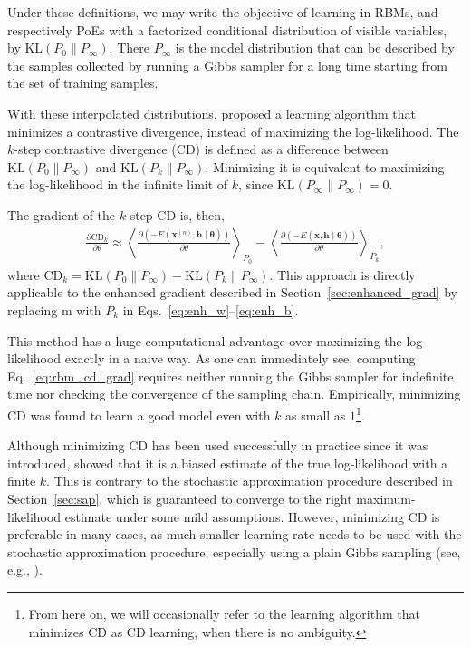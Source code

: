 \documentclass[dissertation,nocontribution,draft*]{aaltoseries}
\newcommand{\vect}[1]{\mathbf{#1}}
\newcommand{\vects}[1]{\boldsymbol{#1}}
\newcommand{\vh}[0]{\vect{h}}
\newcommand{\vx}[0]{\vect{x}}
\newcommand{\tf}[0]{\text{m}}
\newcommand{\TT}[0]{{\vects{\theta}}}
\newcommand{\KL}[0]{\text{KL}}
\newcommand{\CD}[0]{\text{CD}}
\begin{document}
Under these definitions, we may write the objective of
learning in RBMs, and respectively PoEs with a factorized
conditional distribution of visible variables, by $\KL(P_0
\| P_\infty)$. There $P_\infty$ is the model distribution
that can be described by the samples collected by running a
Gibbs sampler for a long time starting from the set of training
samples.

With these interpolated distributions, \citet{Hinton2002}
proposed a learning algorithm that minimizes a contrastive
divergence, instead of maximizing the log-likelihood. The
$k$-step contrastive divergence
(CD) is defined as a
difference between $\KL(P_0 \| P_{\infty})$ and $\KL(P_k \|
P_\infty)$. Minimizing it is equivalent to maximizing
the log-likelihood in the infinite limit of $k$, since
$\KL(P_\infty \| P_\infty) = 0$.

The gradient of the $k$-step CD is, then,
\begin{align}
    \label{eq:rbm_cd_grad}
    \frac{\partial \CD_k}{\partial \theta} \approx
    \left< \frac{\partial
    \left(-E(\vx^{(n)}, \vh\mid\TT)\right)}{\partial \theta}
    \right>_{P_0} 
    -
    \left< \frac{\partial
    \left(-E(\vx, \vh\mid\TT)\right)}{\partial \theta}
    \right>_{P_k},
\end{align}
where $\CD_k = \KL(P_0 \| P_{\infty}) - \KL(P_k
\| P_\infty)$. This approach is directly applicable to the
enhanced gradient described in
Section~\ref{sec:enhanced_grad} by replacing $\tf$ with
$P_k$ in Eqs.~\eqref{eq:enh_w}--\eqref{eq:enh_b}.

This method has a huge computational advantage over
maximizing the log-likelihood exactly in a naive way. As one
can immediately see, computing Eq.~\eqref{eq:rbm_cd_grad}
requires neither running the Gibbs sampler for indefinite
time nor checking the convergence of the sampling chain.
Empirically, minimizing CD was found to learn a good model
even with $k$ as small as $1$\footnote{ From here on, we
will occasionally refer to the learning algorithm that
minimizes CD as CD learning, when there is no ambiguity.  }.

Although minimizing CD has been used successfully in
practice since it was introduced,
\cite{Carreira-Perpinan2005,Bengio2009} showed that it is a
biased estimate of the true log-likelihood with a finite
$k$. This is contrary to the stochastic approximation
procedure described in Section~\ref{sec:sap}, which is
guaranteed to converge to the right maximum-likelihood
estimate under some mild assumptions. However, minimizing CD
is preferable in many cases,
as
much smaller learning rate needs to be used with the
stochastic approximation procedure, especially using a plain
Gibbs sampling (see, e.g., \citep{Hinton2012rbm}).
\end{document}
